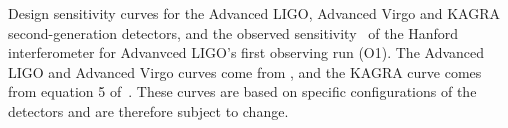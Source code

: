 \label{fig:advcurves}
Design sensitivity curves for the Advanced LIGO, Advanced Virgo
and KAGRA second-generation detectors, and the observed sensitivity~\cite{O1curve} of the Hanford interferometer for Advanvced LIGO's first observing run (O1).
The Advanced LIGO and Advanced Virgo curves come from
\cite{lrr-2016-1}, and the KAGRA curve comes from equation 5 of~\cite{2012arXiv1202.4031M}. These curves are based on specific
configurations of the detectors and are therefore subject to change.